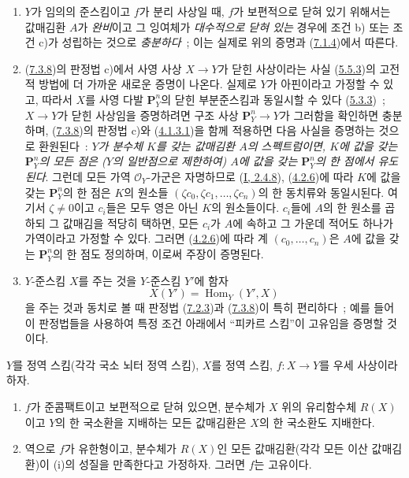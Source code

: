 \begin{remark}[7.3.9]
\label{II.7.3.9-ko}
\begin{enumerate}
\item[\rm (i)] $Y$가 임의의 준스킴이고 $f$가 분리 사상일 때, $f$가
보편적으로 닫혀 있기 위해서는 값매김환 $A$가 \emph{완비}이고 그
잉여체가 \emph{대수적으로 닫혀 있는} 경우에 조건 b) 또는 조건 c)가
성립하는 것으로 \emph{충분하다}~; 이는 실제로 위의 증명과
(\hyperref[II.7.1.4-ko]{7.1.4})에서 따른다.
\item[\rm (ii)] (\hyperref[II.7.3.8-ko]{7.3.8})의 판정법 c)에서 사영
사상 $X\to Y$가 닫힌 사상이라는 사실
(\hyperref[II.5.5.3-ko]{5.5.3})의 고전적 방법에 더 가까운 새로운
증명이 나온다. 실제로 $Y$가 아핀이라고 가정할 수 있고, 따라서
$X$를 사영 다발 $\mathbf{P}_Y^n$의 닫힌 부분준스킴과 동일시할 수 있다
(\hyperref[II.5.3.3-ko]{5.3.3})~; $X\to Y$가 닫힌 사상임을 증명하려면
구조 사상 $\mathbf{P}_Y^n\to Y$가 그러함을 확인하면 충분하며,
(\hyperref[II.7.3.8-ko]{7.3.8})의 판정법 c)와
(\hyperref[II.4.1.3.1-ko]{4.1.3.1})을 함께 적용하면 다음 사실을
증명하는 것으로 환원된다~: \emph{$Y$가 분수체 $K$를 갖는 값매김환
$A$의 스펙트럼이면, $K$에 값을 갖는 $\mathbf{P}_Y^n$의 모든 점은
($Y$의 일반점으로 제한하여) $A$에 값을 갖는 $\mathbf{P}_Y^n$의 한
점에서 유도된다}. 그런데 모든 가역 $\mathcal{O}_Y$-가군은 자명하므로
(\hyperref[I.2.4.8-ko]{I, 2.4.8}),
(\hyperref[II.4.2.6-ko]{4.2.6})에 따라 $K$에 값을 갖는
$\mathbf{P}_Y^n$의 한 점은 $K$의 원소들
$(\zeta c_0,\zeta c_1,\ldots,\zeta c_n)$의 한 동치류와 동일시된다.
여기서 $\zeta\neq0$이고 $c_i$들은 모두 영은 아닌 $K$의 원소들이다.
$c_i$들에 $A$의 한 원소를 곱하되 그
값매김을 적당히 택하면, 모든 $c_i$가 $A$에 속하고 그 가운데 적어도
하나가 가역이라고 가정할 수 있다.
그러면 (\hyperref[II.4.2.6-ko]{4.2.6})에 따라 계
$(c_0,\ldots,c_n)$은 $A$에 값을 갖는 $\mathbf{P}_Y^n$의 한 점도
정의하며, 이로써 주장이 증명된다.
\item[\rm (iii)] $Y$-준스킴 $X$를 주는 것을 $Y$-준스킴 $Y'$에
함자
\[
X(Y')=\operatorname{Hom}_Y(Y',X)
\]
을 주는 것과 동치로 볼 때 판정법
(\hyperref[II.7.2.3-ko]{7.2.3})과
(\hyperref[II.7.3.8-ko]{7.3.8})이 특히 편리하다~; 예를 들어 이
판정법들을 사용하여 특정 조건 아래에서 ``피카르 스킴''이 고유임을
증명할 것이다.
\end{enumerate}
\end{remark}

\begin{corollary}[7.3.10]
\label{II.7.3.10-ko}
$Y$를 정역 스킴(각각 국소 뇌터 정역 스킴), $X$를 정역 스킴,
$f:X\to Y$를 우세 사상이라 하자.
\begin{enumerate}
\item[\rm (i)] $f$가 준콤팩트이고 보편적으로 닫혀 있으면, 분수체가
$X$ 위의 유리함수체 $R(X)$이고 $Y$의 한 국소환을 지배하는 모든
값매김환은 $X$의 한 국소환도 지배한다.
\item[\rm (ii)] 역으로 $f$가 유한형이고, 분수체가 $R(X)$인 모든
값매김환(각각 모든 이산 값매김환)이 (i)의 성질을 만족한다고
가정하자. 그러면 $f$는 고유이다.
\end{enumerate}
\end{corollary}


